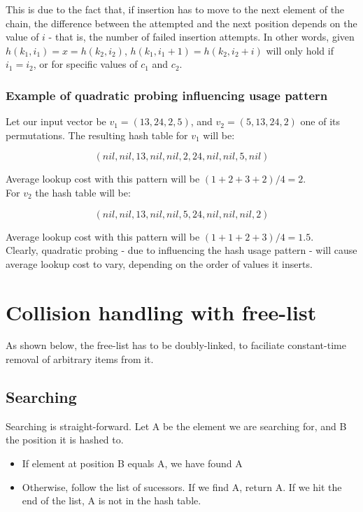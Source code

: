 \documentclass[a4paper]{scrartcl}
\begin{document}
This is due to the fact that, if insertion has to move to the next element of
the chain, the difference between the attempted and the next position depends
on the value of $i$ - that is, the number of failed insertion attempts.  In
other words, given $h(k_1, i_1) = x = h(k_2, i_2)$, $h(k_1, i_1 + 1) = h(k_2,
i_2 + i)$ will only hold if $i_1 = i_2$, or for specific values of $c_1$ and
$c_2$.

\subsubsection{Example of quadratic probing influencing usage pattern}

Let our input vector be $v_1 = (13, 24, 2, 5)$, and $v_2 = (5, 13, 24, 2)$ one
of its permutations. The resulting hash table for $v_1$ will be:

\[
	(nil, nil, 13, nil, nil, 2, 24, nil, nil, 5, nil)
\]

Average lookup cost with this pattern will be $(1 + 2 + 3 + 2) / 4 = 2$.
\\

For $v_2$ the hash table will be:

\[
	(nil, nil, 13, nil, nil, 5, 24, nil, nil, nil, 2)
\]

Average lookup cost with this pattern will be $(1 + 1 + 2 + 3) / 4 = 1.5$.
\\

Clearly, quadratic probing - due to influencing the hash usage pattern - will
cause average lookup cost to vary, depending on the order of values it inserts.

\section{Collision handling with free-list}

As shown below, the free-list has to be doubly-linked, to faciliate
constant-time removal of arbitrary items from it.

\subsection{Searching}

Searching is straight-forward. Let A be the element we are searching for, and B
the position it is hashed to.

\begin{itemize}
	\item If element at position B equals A, we have found A
	\item Otherwise, follow the list of sucessors. If we find A, return
		A. If we hit the end of the list, A is not in the hash table.
\end{itemize}
\end{document}
